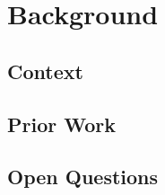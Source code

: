 \chapter{Background}
\label{ch:background}


\section{Context}
\label{sec:background:context}


\section{Prior Work}
\label{sec:background:prior}


\section{Open Questions}
\label{sec:background:open}

